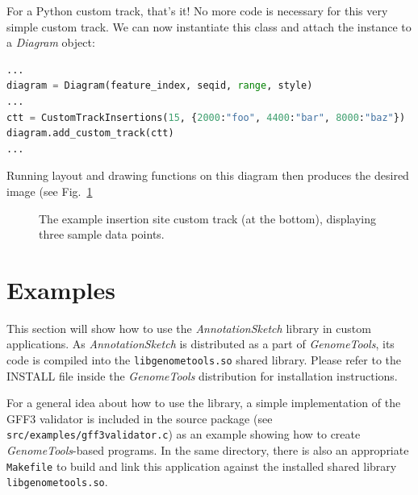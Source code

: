 \documentclass[a4paper]{scrreprt}
\begin{document}
For a Python custom track, that's it! No more code is necessary for this very simple custom track. We can now instantiate this class and attach the instance to a \emph{Diagram} object:

\begin{lstlisting}[language=Python, showstringspaces=false,numbers=none,frame=single]
...
diagram = Diagram(feature_index, seqid, range, style)
...
ctt = CustomTrackInsertions(15, {2000:"foo", 4400:"bar", 8000:"baz"})
diagram.add_custom_track(ctt)
...
\end{lstlisting}

Running layout and drawing functions on this diagram then produces the desired image (see Fig.~\ref{ctexample2}

\begin{figure}[ht]
\caption{The example insertion site custom track (at the bottom), displaying three sample data points.}
\label{ctexample2}
\end{figure}

\section{Examples}

This section will show how to use the \emph{AnnotationSketch} library in custom applications. As \emph{AnnotationSketch} is distributed as a part of \emph{GenomeTools}, its code is compiled into the \texttt{lib\-ge\-nome\-tools.so} shared library. Please refer to the INSTALL file inside the \emph{GenomeTools} distribution for installation instructions.

For a general idea about how to use the library, a simple implementation of the GFF3 validator is included in the source package (see \texttt{src/examples/gff3validator.c}) as an example showing how to create \emph{GenomeTools}-based programs. In the same directory, there is also an appropriate \texttt{Makefile} to build and link this application against the installed shared library \texttt{libgenometools.so}.
\end{document}
